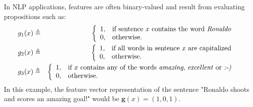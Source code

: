 In NLP applications, features are often binary-valued and result from evaluating propositions such as: 
\begin{eqnarray}
g_1(x) &\triangleq& 
\left\{
\begin{array}{ll}
1, & \text{if sentence $x$ contains the word \emph{Ronaldo}}\\
0, & \text{otherwise.}
\end{array}
\right.\\
g_2(x) &\triangleq& 
\left\{
\begin{array}{ll}
1, & \text{if all words in sentence $x$ are capitalized}\\
0, & \text{otherwise.}
\end{array}
\right.\\
g_3(x) &\triangleq& 
\left\{
\begin{array}{ll}
1, & \text{if $x$ contains any of the words \emph{amazing}, \emph{excellent} or \emph{:-)}}\\
0, & \text{otherwise.}
\end{array}
\right.
\end{eqnarray}  
In this example, the feature vector representation of the sentence "Ronaldo shoots and scores an amazing goal!" would be $\boldsymbol{g}(x) = (1,0,1)$. 

